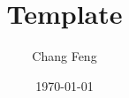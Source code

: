 \documentclass[11pt]{article}
\theoremstyle{plainbreak}
\numberwithin{equation}{section}
\theoremstyle{defbreak}
\begin{document}
\title{ Template }
\author{Chang Feng}
\date{\today}

\maketitle
\end{document}
